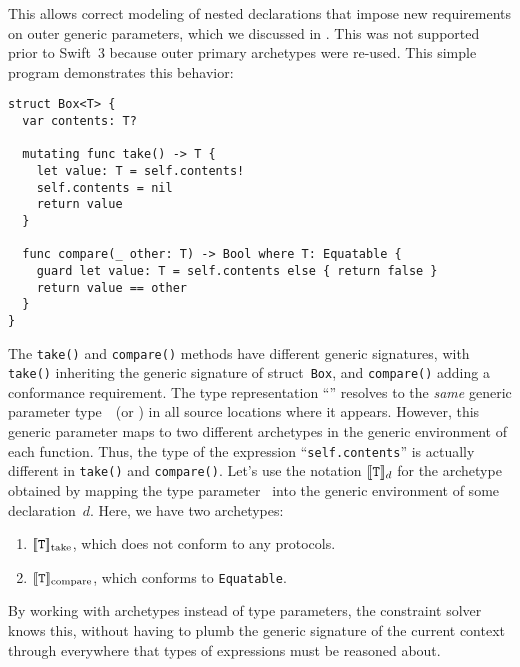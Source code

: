 \documentclass[../generics]{subfiles}
\begin{document}
This allows correct modeling of nested declarations that impose new requirements on outer generic parameters, which we discussed in . This was not supported prior to Swift~3 because outer primary archetypes were re-used. This simple program demonstrates this behavior:
\begin{Verbatim}
struct Box<T> {
  var contents: T?

  mutating func take() -> T {
    let value: T = self.contents!
    self.contents = nil
    return value
  }
  
  func compare(_ other: T) -> Bool where T: Equatable {
    guard let value: T = self.contents else { return false }
    return value == other
  }
}
\end{Verbatim}
The \texttt{take()} and \texttt{compare()} methods have different generic signatures, with \texttt{take()} inheriting the generic signature of struct~\texttt{Box}, and \texttt{compare()} adding a conformance requirement. The type representation ``\tT'' resolves to the \emph{same} generic parameter type~\tT\ (or \rT) in all source locations where it appears. However, this generic parameter maps to two different archetypes in the generic environment of each function. Thus, the type of the expression ``\texttt{self.contents}'' is actually different in \texttt{take()} and \texttt{compare()}. Let's use the notation $[\![\texttt{T}]\!]_d$ for the archetype obtained by mapping the type parameter \tT\ into the generic environment of some declaration~$d$. Here, we have two archetypes:
\begin{enumerate}
\item $[\![\texttt{T}]\!]_\text{take}$, which does not conform to any protocols.
\item $[\![\texttt{T}]\!]_\text{compare}$, which conforms to \texttt{Equatable}.
\end{enumerate}
By working with archetypes instead of type parameters, the constraint solver knows this, without having to plumb the generic signature of the current context through everywhere that types of expressions must be reasoned about.
\end{document}
